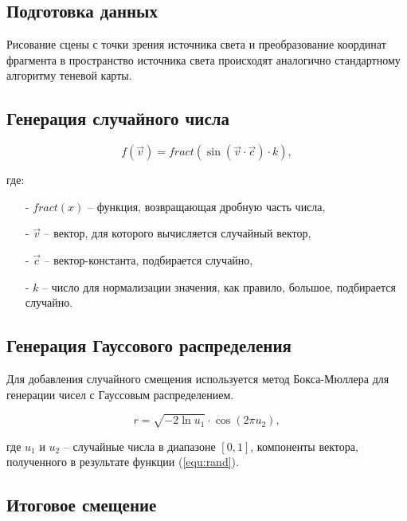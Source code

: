 \subsection*{Подготовка данных}

Рисование сцены с точки зрения источника света и
преобразование координат фрагмента в пространство источника света
происходят аналогично стандартному алгоритму теневой карты.

\subsection*{Генерация случайного числа}

\begin{equation}
    \label{equ:rand}
    f(\vec{v}) = fract(\sin(\vec{v} \cdot \vec{c}) \cdot k),
\end{equation}

\noindent где:

\begin{itemize}
    \item[-] $fract(x)$ -- функция, возвращающая дробную часть числа,
    \item[-] $\vec{v}$ -- вектор, для которого вычисляется случайный вектор,
    \item[-] $\vec{c}$ -- вектор-константа, подбирается случайно,
    \item[-] $k$ -- число для нормализации значения, как правило, большое, подбирается случайно.
\end{itemize}

\subsection*{Генерация Гауссового распределения}

Для добавления случайного смещения используется метод Бокса-Мюллера
для генерации чисел с Гауссовым распределением.

\begin{equation}
    \label{equ:Box_Muller_Gauss}
    r = \sqrt{-2 \ln u_1} \cdot \cos(2 \pi u_2),
\end{equation}

\noindent где $u_1$ и $u_2$ -- случайные числа в диапазоне \([0, 1]\),
компоненты вектора, полученного в результате функции (\ref{equ:rand}).

\subsection*{Итоговое смещение}

